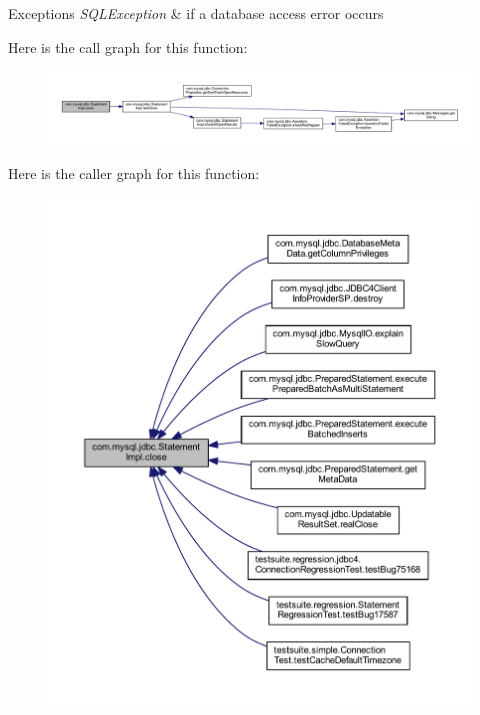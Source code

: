 \begin{DoxyExceptions}{Exceptions}
{\em S\+Q\+L\+Exception} & if a database access error occurs \\
\hline
\end{DoxyExceptions}
Here is the call graph for this function\+:
\nopagebreak
\begin{figure}[H]
\begin{center}
\leavevmode
\includegraphics[width=350pt]{classcom_1_1mysql_1_1jdbc_1_1_statement_impl_a740a220f82b06eace44154a089fbdf18_cgraph}
\end{center}
\end{figure}
Here is the caller graph for this function\+:
\nopagebreak
\begin{figure}[H]
\begin{center}
\leavevmode
\includegraphics[width=350pt]{classcom_1_1mysql_1_1jdbc_1_1_statement_impl_a740a220f82b06eace44154a089fbdf18_icgraph}
\end{center}
\end{figure}
\mbox{\label{classcom_1_1mysql_1_1jdbc_1_1_statement_impl_a62c86a98fa9bd9792873a0d160e7ef59}} 
